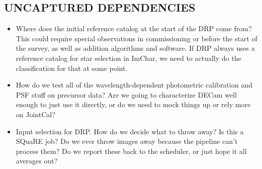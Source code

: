 \subsection{UNCAPTURED DEPENDENCIES}

\begin{itemize}
\item Where does the initial reference catalog at the start of the DRP come from?  This could require special observations in commissioning or before the start of the survey, as well as addition algorithms and software.  If DRP always uses a reference catalog for star selection in ImChar, we need to actually do the classification for that at some point.
\item How do we test all of the wavelength-dependent photometric calibration and PSF stuff on precursor data?  Are we going to characterize DECam well enough to just use it directly, or do we need to mock things up or rely more on JointCal?
\item Input selection for DRP.  How do we decide what to throw away?  Is this a SQuaRE job?  Do we ever throw images away because the pipeline can't process them?  Do we report these back to the scheduler, or just hope it all averages out?
\end{itemize}

